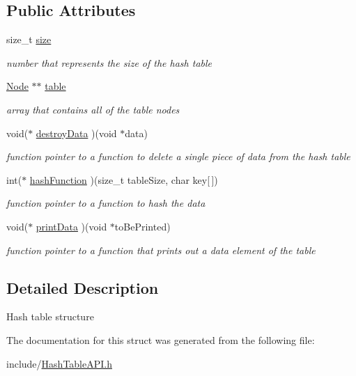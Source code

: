 \subsection*{Public Attributes}
\begin{DoxyCompactItemize}
\item 
\mbox{\label{structHTable_a6ede6f5f1f743298425e0832cfd24a4a}} 
size\+\_\+t \hyperlink{structHTable_a6ede6f5f1f743298425e0832cfd24a4a}{size}
\begin{DoxyCompactList}\small\item\em number that represents the size of the hash table \end{DoxyCompactList}\item 
\mbox{\label{structHTable_ad8f77b5519a173524eee87a5ebb380a0}} 
\hyperlink{structNode}{Node} $\ast$$\ast$ \hyperlink{structHTable_ad8f77b5519a173524eee87a5ebb380a0}{table}
\begin{DoxyCompactList}\small\item\em array that contains all of the table nodes \end{DoxyCompactList}\item 
\mbox{\label{structHTable_a05b3109f3bbfa3fd4b3e55c0bbd29b8a}} 
void($\ast$ \hyperlink{structHTable_a05b3109f3bbfa3fd4b3e55c0bbd29b8a}{destroy\+Data} )(void $\ast$data)
\begin{DoxyCompactList}\small\item\em function pointer to a function to delete a single piece of data from the hash table \end{DoxyCompactList}\item 
\mbox{\label{structHTable_accf145146020fa95d9a1559b956cf679}} 
int($\ast$ \hyperlink{structHTable_accf145146020fa95d9a1559b956cf679}{hash\+Function} )(size\+\_\+t table\+Size, char key\mbox{[}$\,$\mbox{]})
\begin{DoxyCompactList}\small\item\em function pointer to a function to hash the data \end{DoxyCompactList}\item 
\mbox{\label{structHTable_a573abbe70757c842d491ff15d827c002}} 
void($\ast$ \hyperlink{structHTable_a573abbe70757c842d491ff15d827c002}{print\+Data} )(void $\ast$to\+Be\+Printed)
\begin{DoxyCompactList}\small\item\em function pointer to a function that prints out a data element of the table \end{DoxyCompactList}\end{DoxyCompactItemize}


\subsection{Detailed Description}
Hash table structure 

The documentation for this struct was generated from the following file\+:\begin{DoxyCompactItemize}
\item 
include/\hyperlink{HashTableAPI_8h}{Hash\+Table\+A\+P\+I.\+h}\end{DoxyCompactItemize}
